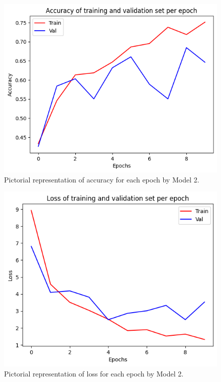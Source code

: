 \documentclass[12pt, a4paper,twoside]{report}
\theoremstyle{plain} %
\theoremstyle{definition} %
\theoremstyle{remark} %
\numberwithin{equation}{chapter}
\begin{document}
\begin{figure}[h]
    \centering
    \includegraphics[scale=0.6]{Model2_acc.png}
    \caption{Pictorial representation of accuracy for each epoch by Model 2.}
    \label{fig:m2_acc}
\end{figure}

\begin{figure}[h]
    \centering
    \includegraphics[scale=0.6]{Model2_loss.png}
    \caption{Pictorial representation of loss for each epoch by Model 2.}
    \label{fig:m2_loss}
\end{figure}
\end{document}
